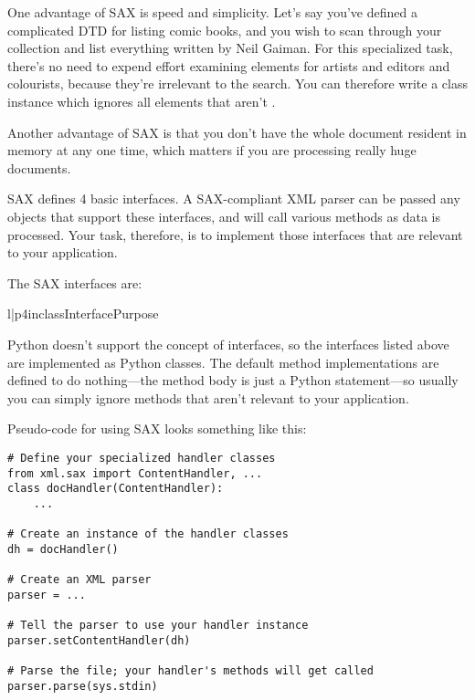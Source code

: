 \documentclass{howto}
\newcommand{\element}[1]{\code{#1}}
\begin{document}
One advantage of SAX is speed and simplicity.  Let's say
you've defined a complicated DTD for listing comic books, and you wish
to scan through your collection and list everything written by Neil
Gaiman.  For this specialized task, there's no need to expend effort
examining elements for artists and editors and colourists, because
they're irrelevant to the search.  You can therefore write a class
instance which ignores all elements that aren't \element{writer}.

Another advantage of SAX is that you don't have the whole document
resident in memory at any one time, which matters if you are
processing really huge documents.  

SAX defines 4 basic interfaces. A SAX-compliant XML parser can be
passed any objects that support these interfaces, and will call
various methods as data is processed.  Your task, therefore, is to
implement those interfaces that are relevant to your application.

The SAX interfaces are:

\begin{tableii}{l|p{4in}}{class}{Interface}{Purpose}





\end{tableii}

Python doesn't support the concept of interfaces, so the interfaces
listed above are implemented as Python classes.  The default method
implementations are defined to do nothing---the method body is just a
Python  statement---so usually you can simply ignore methods
that aren't relevant to your application. 

Pseudo-code for using SAX looks something like this:
\begin{verbatim}
# Define your specialized handler classes
from xml.sax import ContentHandler, ...
class docHandler(ContentHandler):
    ...

# Create an instance of the handler classes
dh = docHandler()

# Create an XML parser
parser = ...

# Tell the parser to use your handler instance
parser.setContentHandler(dh)

# Parse the file; your handler's methods will get called
parser.parse(sys.stdin)
\end{verbatim}
\end{document}
